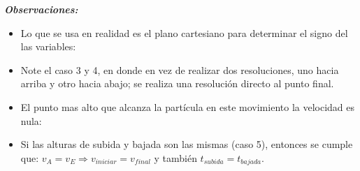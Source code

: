 \textit{\textbf{Observaciones:}}
\begin{itemize}
	\item Lo que se usa en realidad es el plano cartesiano para determinar el signo del las variables:
	\item Note el caso 3 y 4, en donde en vez de realizar dos resoluciones, uno hacia arriba y otro hacia abajo; se realiza una resolución directo al punto final.
	\item El punto mas alto que alcanza la partícula en este movimiento la velocidad es nula:
	\item Si las alturas de subida y  bajada son las mismas (caso 5), entonces se cumple que: $v_A=v_E\Rightarrow v_{iniciar} = v_{final}$ y también $t_{subida}=t_{bajada}$.
	
\end{itemize}